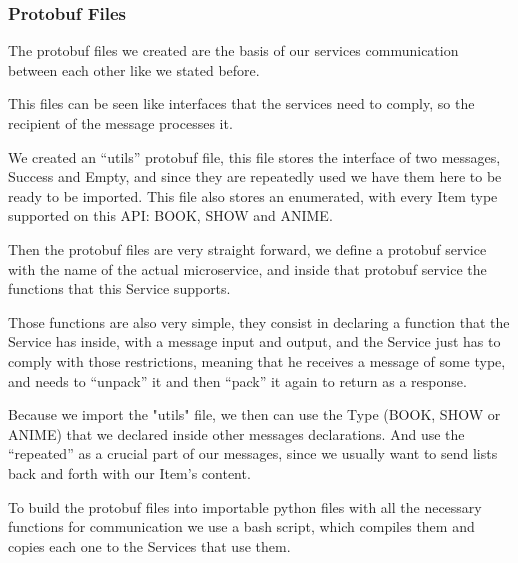 \documentclass[oneside]{article}
\newcommand*\fpar{\hspace{1ex}}
\begin{document}
    \subsubsection{Protobuf Files}
    \fpar The protobuf files we created are the basis of our services communication between each other like we stated before.
    \par This files can be seen like interfaces that the services need to comply, so the recipient of the message processes it.
    \par We created an “utils” protobuf file, this file stores the interface of two messages, Success and Empty, and since they are repeatedly used we have them here to be ready to be imported. This file also stores an enumerated, with every Item type supported on this API: BOOK, SHOW and ANIME.
    \par Then the protobuf files are very straight forward, we define a protobuf service with the name of the actual microservice, and inside that protobuf service the functions that this Service supports.
    \par Those functions are also very simple, they consist in declaring a function that the Service has inside, with a message input and output, and the Service just has to comply with those restrictions, meaning that he receives a message of some type, and needs to “unpack” it and then “pack” it again to return as a response.
    \par Because we import the "utils" file, we then can use the Type (BOOK, SHOW or ANIME) that we declared inside other messages declarations. And use the “repeated” as a crucial part of our messages, since we usually want to send lists back and forth with our Item's content.
    \par To build the protobuf files into importable python files with all the necessary functions for communication we use a bash script, which compiles them and copies each one to the Services that use them.
      
\end{document}
